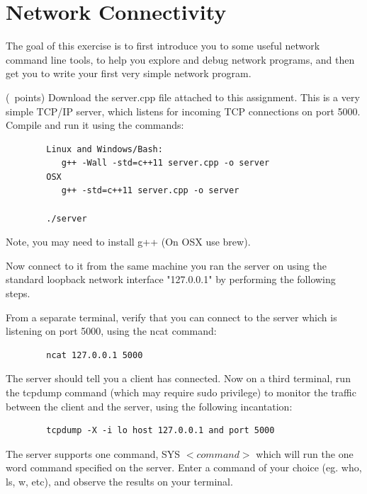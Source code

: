 \documentclass[9pt, addpoints]{exam}
\begin{document}
\section*{Network Connectivity}
The goal of this exercise is to first introduce you to some useful network
command line tools, to help you explore and debug network programs, and 
then get you to write your first very simple network program. 
\begin{questions}
    \question(\totalpoints\ points)
     Download the server.cpp file attached to this assignment.
     This is a very simple TCP/IP server, which listens for incoming
     TCP connections on port 5000.  Compile and run it using the commands:
     \begin{lstlisting}
        Linux and Windows/Bash:
           g++ -Wall -std=c++11 server.cpp -o server
        OSX
           g++ -std=c++11 server.cpp -o server

        ./server
     \end{lstlisting}

     Note, you may need to install g++ (On OSX use brew).

     Now connect to it from the same machine you ran the server on
     using the standard loopback network interface "127.0.0.1"
     by performing the following steps.

     From a separate terminal, verify that you can connect to the server 
     which is listening on port 5000, using the ncat command: 

     \begin{lstlisting}
        ncat 127.0.0.1 5000  
     \end{lstlisting}
     
     The server should tell you a client has connected.
     Now on a third terminal, run the tcpdump command (which may require sudo privilege) 
     to monitor the traffic between the client and the server, using the following incantation:

     \begin{lstlisting}
        tcpdump -X -i lo host 127.0.0.1 and port 5000
     \end{lstlisting}

     The server supports one command, SYS $<command>$ which will run the one word command
     specified on the server. Enter a command of your choice (eg. who, ls, w, etc), and 
     observe the results on your terminal. 

\end{questions}
\end{document}
